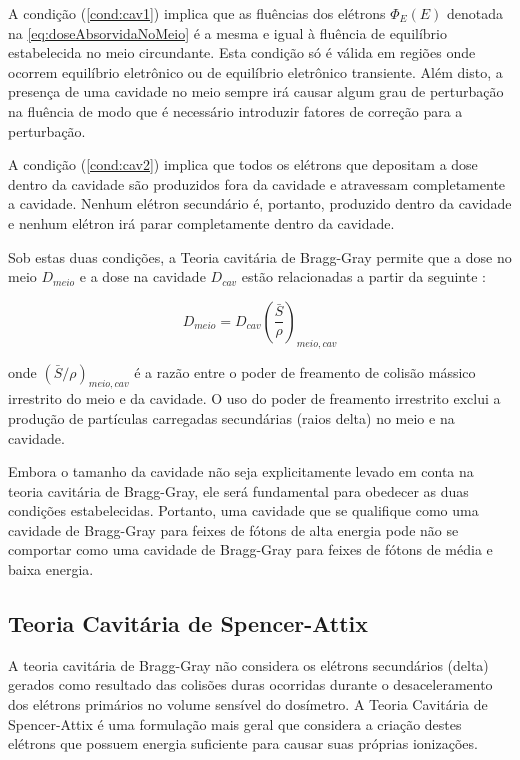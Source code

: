 \documentclass[11pt,a4paper]{article}
\begin{document}
			A condição (\ref{cond:cav1}) implica que as fluências dos elétrons $\Phi_E(E)$ denotada na   \ref{eq:doseAbsorvidaNoMeio} é a mesma e  igual à fluência de equilíbrio estabelecida no meio circundante. Esta condição só é válida em regiões onde ocorrem equilíbrio eletrônico ou de equilíbrio eletrônico transiente. Além disto, a presença de uma cavidade no meio sempre irá causar algum grau de perturbação na fluência de modo que é necessário introduzir fatores de correção para a perturbação.

			A condição (\ref{cond:cav2}) implica que todos os elétrons que depositam a dose dentro da cavidade são produzidos fora da cavidade e atravessam completamente a cavidade. Nenhum elétron secundário é, portanto, produzido dentro da cavidade e nenhum elétron irá parar completamente dentro da cavidade. 

			Sob estas duas condições, a Teoria cavitária de Bragg-Gray permite que a dose no meio $D_{meio}$ e a dose na cavidade $D_{cav}$ estão relacionadas a partir da seguinte  :

				\begin{equation}
					D_{meio} = D_{cav} \left(\frac{\bar{S}}{\rho}\right)_{meio, cav}
				\end{equation}

			\noindent onde $(\bar{S}/\rho)_{meio,cav}$ é a razão entre o poder de freamento de colisão mássico irrestrito do meio e da cavidade. O uso do poder de freamento irrestrito exclui a produção de partículas carregadas secundárias (raios delta) no meio e na cavidade.


			Embora o tamanho da cavidade não seja explicitamente levado em conta na teoria cavitária de Bragg-Gray, ele será fundamental para obedecer as duas condições estabelecidas. Portanto, uma cavidade que se qualifique como uma cavidade de Bragg-Gray para feixes de fótons de alta energia pode não se comportar como uma cavidade de Bragg-Gray para feixes de fótons de média e baixa energia.


		\subsection{Teoria Cavitária de Spencer-Attix}

			A teoria cavitária de Bragg-Gray não considera os elétrons secundários (delta) gerados como resultado das colisões duras ocorridas durante o desaceleramento dos elétrons primários no volume sensível do dosímetro. A Teoria Cavitária de Spencer-Attix é uma formulação mais geral que considera a criação destes elétrons que possuem energia suficiente para causar suas próprias ionizações. 
\end{document}
